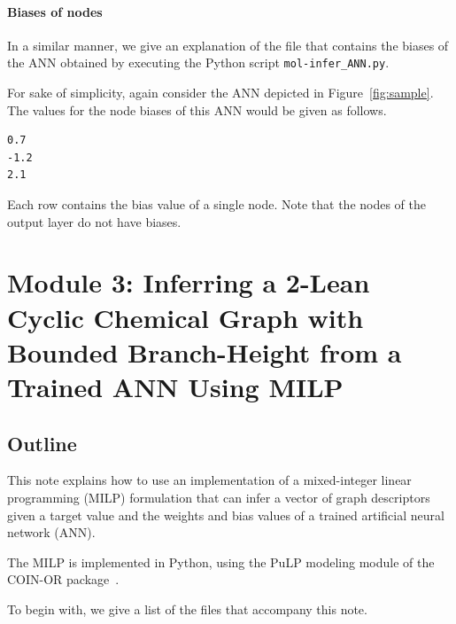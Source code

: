 \documentclass[11pt,titlepage,dvipdfmx,twoside]{book}
\newcommand{\figref}[1]{Figure~\ref{fig:#1}}
\begin{document}
\subsubsection{Biases of nodes}
In a similar manner,
we give an explanation of the file that contains the
biases of the ANN obtained
by executing the Python script \verb|mol-infer_ANN.py|.

For sake of simplicity, again consider
the ANN depicted in \figref{sample}.
The values for the node biases of this ANN would be given as follows.
%
\begin{oframed}
{\small
\begin{verbatim}
0.7
-1.2
2.1
\end{verbatim}
}
\end{oframed}
Each row contains the bias value of a single node.
Note that the nodes of the output layer do not have biases.



\chapter{Module 3:
Inferring a 2-Lean Cyclic Chemical Graph with Bounded Branch-Height
from a Trained ANN Using MILP
}


\section{Outline}
\label{sec:Intro}

This note explains how to use an implementation of a mixed-integer
linear programming (MILP) formulation that can infer
a vector of graph descriptors given a target value and the 
weights and bias values of a trained artificial neural network (ANN).

The MILP is implemented in Python, 
using the PuLP modeling module of the 
COIN-OR package~\cite{PuLP1,PuLP2,PuLP3,PuLP4}.

To begin with, we give a list of the files that accompany this note.
\end{document}
